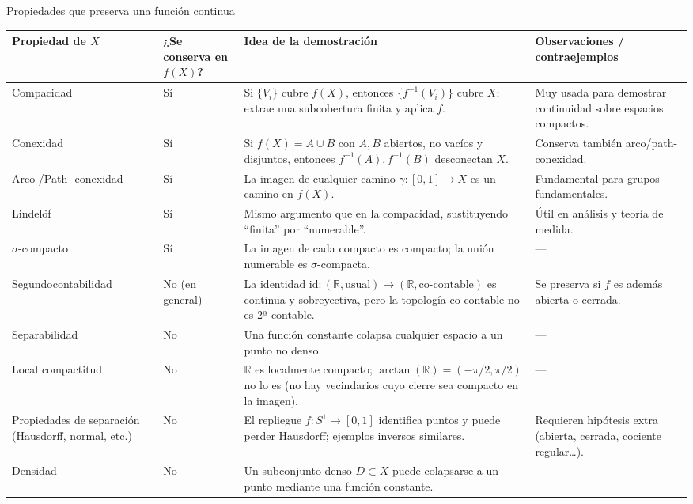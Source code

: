\documentclass[11pt]{article}
\begin{document}
\begin{center}
{\LARGE Propiedades que preserva una función continua}\\[1em]
\end{center}

\setlength{\extrarowheight}{2pt}
\begin{longtable}{p{3cm}p{2.8cm}p{5cm}p{4cm}}
\toprule
\textbf{Propiedad de $X$} & \textbf{¿Se conserva en $f(X)$?} & \textbf{Idea de la demostración} & \textbf{Observaciones / contra\-ejemplos} \\
\midrule
Compacidad & Sí & Si $\{V_i\}$ cubre $f(X)$, entonces $\{f^{-1}(V_i)\}$ cubre $X$; extrae una subcobertura finita y aplica $f$. & Muy usada para demostrar continuidad sobre espacios compactos.\\
\addlinespace
Conexidad & Sí & Si $f(X)=A\cup B$ con $A,B$ abiertos, no vacíos y disjuntos, entonces $f^{-1}(A),f^{-1}(B)$ desconectan $X$. & Conserva también arco/path-conexidad.\\
\addlinespace
Arco-/Path- conexidad & Sí & La imagen de cualquier camino $\gamma:[0,1]\to X$ es un camino en $f(X)$. & Fundamental para grupos fundamentales.\\
\addlinespace
Lindelöf & Sí & Mismo argumento que en la compacidad, sustituyendo “finita” por “numerable”. & Útil en análisis y teoría de medida.\\
\addlinespace
$\sigma$-compacto & Sí & La imagen de cada compacto es compacto; la unión numerable es $\sigma$-compacta. & ---\\
\addlinespace
Segundocontabilidad & No (en general) & La identidad $\mathrm{id}:(\mathbb R,\text{usual})\to(\mathbb R,\text{co-contable})$ es continua y sobreyectiva, pero la topología co-contable no es 2ª-contable. & Se preserva si $f$ es además abierta o cerrada.\\
\addlinespace
Separabilidad & No & Una función constante colapsa cualquier espacio a un punto no denso. & ---\\
\addlinespace
Local compactitud & No & $\mathbb R$ es localmente compacto; $\arctan(\mathbb R)=(-\pi/2,\pi/2)$ no lo es (no hay vecindarios cuyo cierre sea compacto en la imagen). & ---\\
\addlinespace
Propiedades de separación (Hausdorff, normal, etc.) & No & El repliegue $f:S^1\to [0,1]$ identifica puntos y puede perder Hausdorff; ejemplos inversos similares. & Requieren hipótesis extra (abierta, cerrada, cociente regular…).\\
\addlinespace
Densidad & No & Un subconjunto denso $D\subset X$ puede colapsarse a un punto mediante una función constante. & ---\\
\bottomrule
\end{longtable}
\end{document}
